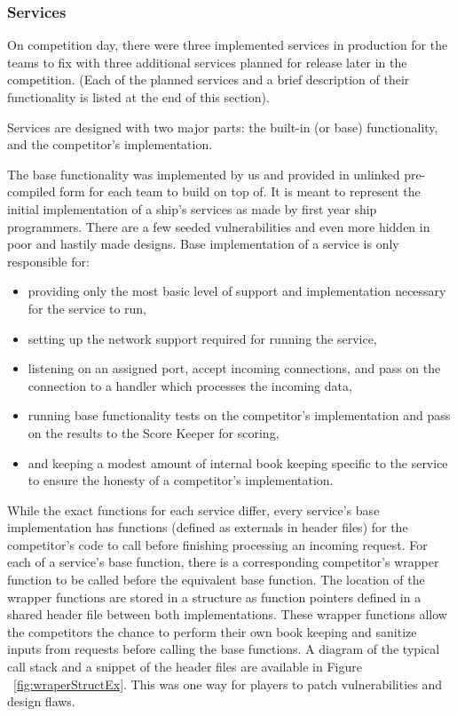 \documentclass[10pt]{article}
\begin{document}
\subsubsection{Services}
\label{stservices}
On competition day, there were three implemented services in production for the
teams to fix with three additional services planned for release later in the
competition. (Each of the planned services and a brief description of their
functionality is listed at the end of this section).

Services are designed with two major parts: the built-in (or base)
functionality, and the competitor's implementation.

The base functionality was implemented by us and provided in unlinked
pre-compiled form for each team to build on top of. It is meant to represent the
initial implementation of a ship's services as made by first year ship
programmers. There are a few seeded vulnerabilities and even more hidden in poor
and hastily made designs. Base implementation of a service is only responsible
for:

\begin{itemize}
    \item providing only the most basic level of support and implementation
    necessary for the service to run, 
    \item setting up the network support required for running the service,
    \item listening on an assigned port, accept incoming connections, and pass
    on the connection to a handler which processes the incoming data,
    \item running base functionality tests on the competitor's implementation and
    pass on the results to the Score Keeper for scoring,
    \item and keeping a modest amount of internal book keeping specific to the
    service to ensure the honesty of a competitor's implementation.
\end{itemize}

While the exact functions for each service differ, every service's base
implementation has functions (defined as externals in header files)
for the competitor's code to call before finishing processing an incoming
request. For each of a service's base function, there is a corresponding
competitor's wrapper function to be called before the equivalent base function.
The location of the wrapper functions are stored in a structure as function
pointers defined in a shared header file between both implementations. These
wrapper functions allow the competitors the chance to perform their own book
keeping and sanitize inputs from requests before calling the base functions. A
diagram of the typical call stack and a snippet of the header files are
available in Figure ~\ref{fig:wraperStructEx}. This was one way for players to
patch vulnerabilities and design flaws.
\end{document}
